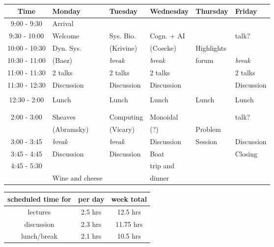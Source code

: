 \documentclass{article}
\begin{document}
\begin{table}[h!]
\begin{center}
\begin{tabular}{|c||p{.15\linewidth}|p{.15\linewidth}|p{.15\linewidth}|p{.15\linewidth}|p{.15\linewidth}|}
\hline
Time & Monday & Tuesday & Wednesday & Thursday & Friday \\ \hline
9:00 - 9:30 & Arrival & & & & \\ \cline{2-4} \cline{6-6}
9:30 - 10:00 & Welcome & Sys. Bio. & Cogn. + AI &  & talk? \\ \cline{2-2}
10:00 - 10:30 & Dyn. Sys. & (Krivine)  & (Coecke) & Highlights & \\ \cline{3-4} \cline{6-6}
10:30 - 11:00 & (Baez) & \emph{break} & \emph{break} & forum & \emph{break} \\  \cline{2-4} \cline{6-6}
11:00 - 11:30 & 2 talks & 2 talks & 2 talks & & 2 talks \\ \cline{2-4} \cline{6-6}
11:30 - 12:30 & Discussion & Discussion & Discussion & & Discussion \\ 
&&&&& \\\hline
12:30 - 2:00 & Lunch & Lunch & Lunch & Lunch & Lunch \\
&&&&& \\
&&&&& \\ \hline
2:00 - 3:00 & Sheaves & Computing & Monoidal & & talk? \\
& (Abramsky) & (Vicary) & (?) & Problem & \\ \cline{2-4} \cline{6-6}
3:00 - 3:45 & \emph{break} & \emph{break} & Discussion & Session & Discussion \\ \cline{2-4} \cline{6-6}
3:45 - 4:45 & Discussion & Discussion & Boat & & Closing \\ 
4:45 - 5:30 & & & trip and & & \\ \cline{2-3} \cline{5-6}
& Wine and cheese & & dinner & &  \\ \hline
\end{tabular}
\end{center}
\end{table}%

\begin{table}[h!]
\begin{center}
\begin{tabular}{|c|c|c|} \hline
scheduled time for & per day & week total \\ \hline
lectures & 2.5 hrs & 12.5 hrs  \\
discussion & 2.3 hrs & 11.75 hrs \\
lunch/break & 2.1 hrs & 10.5 hrs \\ \hline
\end{tabular}
\end{center}
\end{table}%
\end{document}
